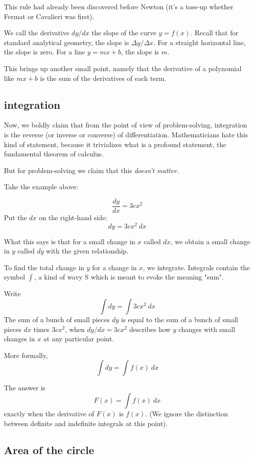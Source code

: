 \documentclass[11pt, oneside]{article}
\begin{document}
This rule had already been discovered before Newton (it's a toss-up whether Fermat or Cavalieri was first).

We call the derivative $dy/dx$ the slope of the curve $y = f(x)$.  Recall that for standard analytical geometry, the slope is $\Delta y/\Delta x$.  For a straight horizontal line, the slope is zero.  For a line $y = mx + b$, the slope is $m$.

This brings up another small point, namely that the derivative of a polynomial like $mx + b$ is the sum of the derivatives of each term.

\subsection*{integration}

Now, we boldly claim that from the point of view of problem-solving, integration is the reverse (or inverse or converse) of differentiation.  Mathematicians hate this kind of statement, because it trivializes what is a profound statement, the fundamental theorem of calculus.  

But for problem-solving we claim that this \emph{doesn't matter}.

Take the example above:

 \[ \frac{dy}{dx} = 3cx^2 \]
Put the $dx$ on the right-hand side:
\[ dy = 3cx^2 \ dx \]

What this says is that for a small change in $x$ called $dx$, we obtain a small change in $y$ called $dy$ with the given relationship.

To find the total change in $y$ for a change in $x$, we integrate.  Integrals contain the symbol $\int$, a kind of wavy S which is meant to evoke the meaning "sum".

Write
\[ \int dy = \int 3cx^2 \ dx \]
The sum of a bunch of small pieces $dy$ is equal to the sum of a bunch of small pieces $dx$ times $3cx^2$, when $dy/dx= 3cx^2$ describes how $y$ changes with small changes in $x$ at any particular point.

More formally,
\[ \int dy = \int f(x) \ dx \]

The answer is
\[ F(x) =  \int f(x) \ dx \]
exactly when the derivative of $F(x)$ is $f(x)$.  (We ignore the distinction between definite and indefinite integrals at this point).

\label{sec:Easy_pieces}

\subsection*{Area of the circle}
\end{document}

